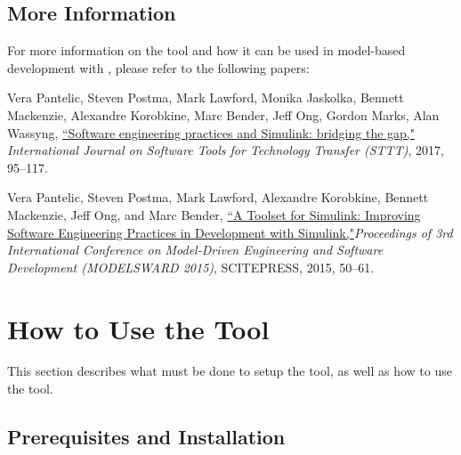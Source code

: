 \documentclass{article}
\begin{document}
\subsection{More Information}
For more information on the tool and how it can be used in model-based development with \Simulink, please refer to the following papers:

\vspace{1em}
Vera Pantelic, Steven Postma, Mark Lawford, Monika Jaskolka, Bennett Mackenzie, Alexandre Korobkine, Marc Bender, Jeff Ong, Gordon Marks, Alan Wassyng, \href{https://link.springer.com/article/10.1007/s10009-017-0450-9}{``Software engineering practices and Simulink: bridging the gap,"} \textit{International Journal on Software Tools for Technology Transfer (STTT)}, 2017, 95--117.

\vspace{1em}
Vera Pantelic, Steven Postma, Mark Lawford, Alexandre Korobkine, Bennett Mackenzie, Jeff Ong, and Marc Bender, \href{http://www.cas.mcmaster.ca/~lawford/papers/MODELSWARD2015.pdf}{``A Toolset for Simulink: Improving Software Engineering Practices in Development with Simulink,"}\textit{Proceedings of 3rd International Conference on Model-Driven Engineering and Software Development (MODELSWARD 2015)}, SCITEPRESS, 2015, 50--61.

\newpage	
\section{How to Use the Tool}
This section describes what must be done to setup the tool, as well as how to use the tool.

\subsection{Prerequisites and Installation}
\end{document}
